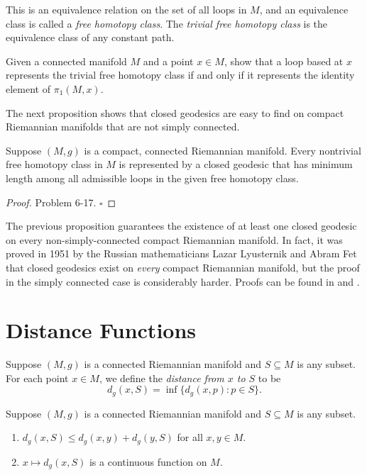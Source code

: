 This is an equivalence relation on the set of all loops in $M$, and an equivalence class is called a \emph{free homotopy class}. The \emph{trivial free homotopy class} is the equivalence class of any constant path.

\begin{exercise}
\label{exer:trivial-free-homotopy-identity}

Given a connected manifold $M$ and a point $x \in M$, show that a loop based at $x$ represents the trivial free homotopy class if and only if it represents the identity element of $\pi_1(M, x)$.
\end{exercise}

The next proposition shows that closed geodesics are easy to find on compact Riemannian manifolds that are not simply connected.

\begin{proposition}
\label{prop:existence-closed-geodesics}
Suppose $(M, g)$ is a compact, connected Riemannian manifold. Every nontrivial free homotopy class in $M$ is represented by a closed geodesic that has minimum length among all admissible loops in the given free homotopy class.
\end{proposition}

\begin{proof}
Problem 6-17. $\square$
\end{proof}

The previous proposition guarantees the existence of at least one closed geodesic on every non-simply-connected compact Riemannian manifold. In fact, it was proved in 1951 by the Russian mathematicians Lazar Lyusternik and Abram Fet that closed geodesics exist on \emph{every} compact Riemannian manifold, but the proof in the simply connected case is considerably harder. Proofs can be found in \cite{Jos17} and \cite{Kli95}.

\section{Distance Functions}

Suppose $(M, g)$ is a connected Riemannian manifold and $S \subseteq M$ is any subset. For each point $x \in M$, we define the \emph{distance from $x$ to $S$} to be
\[
d_g(x, S) = \inf\{d_g(x, p) : p \in S\}.
\]

\begin{lemma}
\label{lem:distance-triangle-inequality-and-continuity}

Suppose $(M, g)$ is a connected Riemannian manifold and $S \subseteq M$ is any subset.
\begin{enumerate}[label=(\alph*)]
\item $d_g(x, S) \leq d_g(x, y) + d_g(y, S)$ for all $x, y \in M$.
\item $x \mapsto d_g(x, S)$ is a continuous function on $M$.
\end{enumerate}
\end{lemma}

